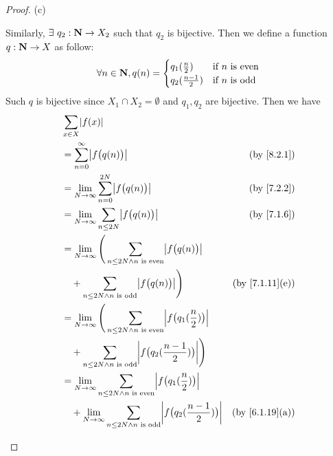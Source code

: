 \begin{proof}{(c)}
\begin{itemize}
          Similarly, \(\exists\ q_2 : \mathbf{N} \to X_2\) such that \(q_2\) is bijective.
          Then we define a function \(q : \mathbf{N} \to X\) as follow:
          \[
            \forall n \in \mathbf{N}, q(n) = \begin{cases}
              q_1(\frac{n}{2})     & \text{if } n \text{ is even} \\
              q_2(\frac{n - 1}{2}) & \text{if } n \text{ is odd}
            \end{cases}
          \]
          Such \(q\) is bijective since \(X_1 \cap X_2 = \emptyset\) and \(q_1, q_2\) are bijective.
          Then we have
          \begin{align*}
             & \sum_{x \in X} \abs{f(x)}                                                                                                                                \\
             & = \sum_{n = 0}^\infty \abs{f\big(q(n)\big)}                                                                               & \text{(by \cref{8.2.1})}     \\
             & = \lim_{N \to \infty} \sum_{n = 0}^{2N} \abs{f\big(q(n)\big)}                                                             & \text{(by \cref{7.2.2})}     \\
             & = \lim_{N \to \infty} \sum_{n \leq 2N} \abs{f\big(q(n)\big)}                                                              & \text{(by \cref{7.1.6})}     \\
             & = \lim_{N \to \infty} \Bigg(\sum_{n \leq 2N \land n \text{ is even}} \abs{f\big(q(n)\big)}                                                               \\
             & \quad + \sum_{n \leq 2N \land n \text{ is odd}} \abs{f\big(q(n)\big)}\Bigg)                                               & \text{(by \cref{7.1.11}(e))} \\
             & = \lim_{N \to \infty} \Bigg(\sum_{n \leq 2N \land n \text{ is even}} \abs{f\big(q_1(\frac{n}{2})\big)}                                                   \\
             & \quad + \sum_{n \leq 2N \land n \text{ is odd}} \abs{f\big(q_2(\frac{n - 1}{2})\big)}\Bigg)                                                              \\
             & = \lim_{N \to \infty} \sum_{n \leq 2N \land n \text{ is even}} \abs{f\big(q_1(\frac{n}{2})\big)}                                                         \\
             & \quad + \lim_{N \to \infty} \sum_{n \leq 2N \land n \text{ is odd}} \abs{f\big(q_2(\frac{n - 1}{2})\big)}                 & \text{(by \cref{6.1.19}(a))} \\

\end{align*}
\end{itemize}
\end{proof}
